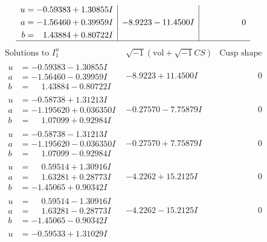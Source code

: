 \documentclass[1p]{elsarticle_modified}
\theoremstyle{definition}
\newcommand{\I}{\sqrt{-1}}
\begin{document}
$$\begin{array}{c|c|c}
\begin{aligned}
u &= -0.59383 + 1.30855 I \\
a &= -1.56460 + 0.39959 I \\
b &= \phantom{-}1.43884 + 0.80722 I\end{aligned}
 & -8.9223 - 11.4500 I & \phantom{-0.000000 } 0\\
 \hline 
 \end{array}$$\newpage$$\begin{array}{c|c|c}  
\text{Solutions to }I^u_{1}& \I (\text{vol} + \sqrt{-1}CS) & \text{Cusp shape}\\
 \hline 
\begin{aligned}
u &= -0.59383 - 1.30855 I \\
a &= -1.56460 - 0.39959 I \\
b &= \phantom{-}1.43884 - 0.80722 I\end{aligned}
 & -8.9223 + 11.4500 I & \phantom{-0.000000 } 0 \\ \hline\begin{aligned}
u &= -0.58738 + 1.31213 I \\
a &= -1.195620 + 0.036350 I \\
b &= \phantom{-}1.07099 + 0.92984 I\end{aligned}
 & -0.27570 - 7.75879 I & \phantom{-0.000000 } 0 \\ \hline\begin{aligned}
u &= -0.58738 - 1.31213 I \\
a &= -1.195620 - 0.036350 I \\
b &= \phantom{-}1.07099 - 0.92984 I\end{aligned}
 & -0.27570 + 7.75879 I & \phantom{-0.000000 } 0 \\ \hline\begin{aligned}
u &= \phantom{-}0.59514 + 1.30916 I \\
a &= \phantom{-}1.63281 + 0.28773 I \\
b &= -1.45065 + 0.90342 I\end{aligned}
 & -4.2262 + 15.2125 I & \phantom{-0.000000 } 0 \\ \hline\begin{aligned}
u &= \phantom{-}0.59514 - 1.30916 I \\
a &= \phantom{-}1.63281 - 0.28773 I \\
b &= -1.45065 - 0.90342 I\end{aligned}
 & -4.2262 - 15.2125 I & \phantom{-0.000000 } 0 \\ \hline\begin{aligned}
u &= -0.59533 + 1.31029 I \\

\end{aligned}
\end{array}$$
\end{document}
